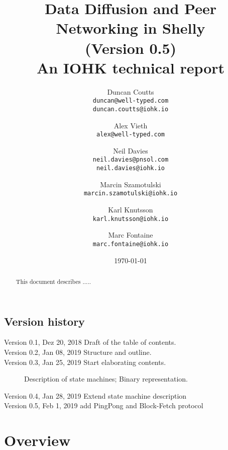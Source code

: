 \documentclass{report}
\theoremstyle{definition}{
  \newtheorem{lemma}{Lemma}[section] %
  \newtheorem{definition}[lemma]{Definition}
}
\theoremstyle{theorem}{
  \newtheorem{invariant}[lemma]{Invariant}
  \newtheorem{proofobligation}[lemma]{Proof Obligation}
}
\numberwithin{equation}{lemma}
\begin{document}
\title{Data Diffusion and Peer Networking in Shelly\\
       {\small (Version 0.5)} \\
       {\large \sc An IOHK technical report}}
\author{Duncan Coutts \\ {\small \texttt{duncan@well-typed.com}} \\
                         {\small \texttt{duncan.coutts@iohk.io}}
   \and Alex Vieth \\ {\small \texttt{alex@well-typed.com}}
   \and Neil Davies \\ {\small \texttt{neil.davies@pnsol.com}} \\
                       {\small \texttt{neil.davies@iohk.io}}
   \and Marcin Szamotulski \\ {\small \texttt{marcin.szamotulski@iohk.io}}
   \and Karl Knutsson \\ {\small \texttt{karl.knutsson@iohk.io}}
   \and Marc Fontaine \\ {\small \texttt{marc.fontaine@iohk.io}}
   }
\date{\today}

\maketitle

\begin{abstract}
  This document describes .....
\end{abstract}

\tableofcontents

\section*{Version history}

\begin{description}
\item[Version 0.1, Dez 20, 2018  Draft of the table of contents.]
\item[Version 0.2, Jan 08, 2019 Structure and outline.]
\item[Version 0.3, Jan 25, 2019 Start elaborating contents.]
  Description of state machines; Binary representation.
\item[Version 0.4, Jan 28, 2019 Extend state machine description]
\item[Version 0.5, Feb 1, 2019  add PingPong and Block-Fetch protocol]
\end{description}

\chapter{Overview}
\end{document}
